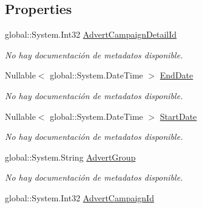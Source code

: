 \subsection*{Properties}
\begin{DoxyCompactItemize}
\item 
global\-::\-System.\-Int32 \hyperlink{class_microsoft_1_1_samples_1_1_kinect_1_1_basic_interactions_1_1_advert_campaign_details_a8a9ff16e0184ae521398b15a0f91f681}{Advert\-Campaign\-Detail\-Id}
\begin{DoxyCompactList}\small\item\em No hay documentación de metadatos disponible. \end{DoxyCompactList}\item 
Nullable$<$ global\-::\-System.\-Date\-Time $>$ \hyperlink{class_microsoft_1_1_samples_1_1_kinect_1_1_basic_interactions_1_1_advert_campaign_details_ad3526340642343142ad737d5f6b7f8bc}{End\-Date}
\begin{DoxyCompactList}\small\item\em No hay documentación de metadatos disponible. \end{DoxyCompactList}\item 
Nullable$<$ global\-::\-System.\-Date\-Time $>$ \hyperlink{class_microsoft_1_1_samples_1_1_kinect_1_1_basic_interactions_1_1_advert_campaign_details_af3c3f72b1e11364497632ca2d3ba6da7}{Start\-Date}
\begin{DoxyCompactList}\small\item\em No hay documentación de metadatos disponible. \end{DoxyCompactList}\item 
global\-::\-System.\-String \hyperlink{class_microsoft_1_1_samples_1_1_kinect_1_1_basic_interactions_1_1_advert_campaign_details_a657b3817f3b4aeff89c4091b2178bd29}{Advert\-Group}
\begin{DoxyCompactList}\small\item\em No hay documentación de metadatos disponible. \end{DoxyCompactList}\item 
global\-::\-System.\-Int32 \hyperlink{class_microsoft_1_1_samples_1_1_kinect_1_1_basic_interactions_1_1_advert_campaign_details_a8e5083c7cbbc70c960678ef473690b3c}{Advert\-Campaign\-Id}

\end{DoxyCompactItemize}
